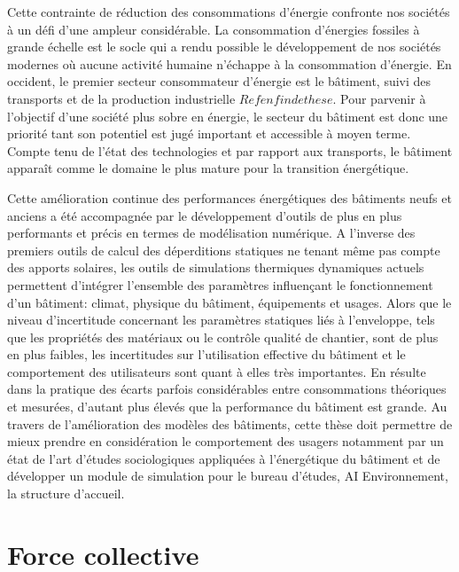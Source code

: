 Cette contrainte de réduction des consommations d'énergie confronte nos sociétés à un défi d'une ampleur considérable. La consommation d'énergies fossiles à grande échelle est le socle qui a rendu possible le développement de nos sociétés modernes où aucune activité humaine n'échappe à la consommation d'énergie. En occident, le premier secteur consommateur d'énergie est le bâtiment, suivi des transports et de la production industrielle $Ref en fin de these$. Pour parvenir à l'objectif d'une société plus sobre en énergie, le secteur du bâtiment est donc une priorité tant son potentiel est jugé important et accessible à moyen terme. Compte tenu de l'état des technologies et par rapport aux transports, le bâtiment apparaît comme le domaine le plus mature pour la transition énergétique.

Cette amélioration continue des performances énergétiques des bâtiments neufs et anciens a été accompagnée par le développement d'outils de plus en plus performants et précis en termes de modélisation numérique. A l'inverse des premiers outils de calcul des déperditions statiques ne tenant même pas compte des apports solaires, les outils de simulations thermiques dynamiques actuels permettent d'intégrer l'ensemble des paramètres influençant le fonctionnement d'un bâtiment: climat, physique du bâtiment, équipements et usages. Alors que le niveau d'incertitude concernant les paramètres statiques liés à l'enveloppe, tels que les propriétés des matériaux ou le contrôle qualité de chantier, sont de plus en plus faibles, les incertitudes sur l'utilisation effective du bâtiment et le comportement des utilisateurs sont quant à elles très importantes. En résulte dans la pratique des écarts parfois considérables entre consommations théoriques et mesurées, d'autant plus élevés que la performance du bâtiment est grande. Au travers de l'amélioration des modèles des bâtiments, cette thèse doit permettre de mieux prendre en considération le comportement des usagers notamment par un état de l'art d'études sociologiques appliquées à l'énergétique du bâtiment et de développer un module de simulation pour le bureau d'études, AI Environnement, la structure d'accueil.

\section*{Force collective}

